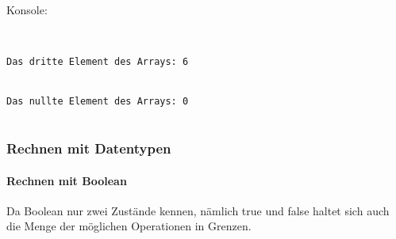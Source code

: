 Konsole:


\begin{lstlisting}[style=console]


Das dritte Element des Arrays: 6


Das nullte Element des Arrays: 0


\end{lstlisting}


\subsubsection{Rechnen mit Datentypen}


\paragraph{Rechnen mit Boolean}


Da Boolean nur zwei Zustände kennen, nämlich true und false haltet sich auch die Menge der möglichen Operationen in Grenzen. 	







